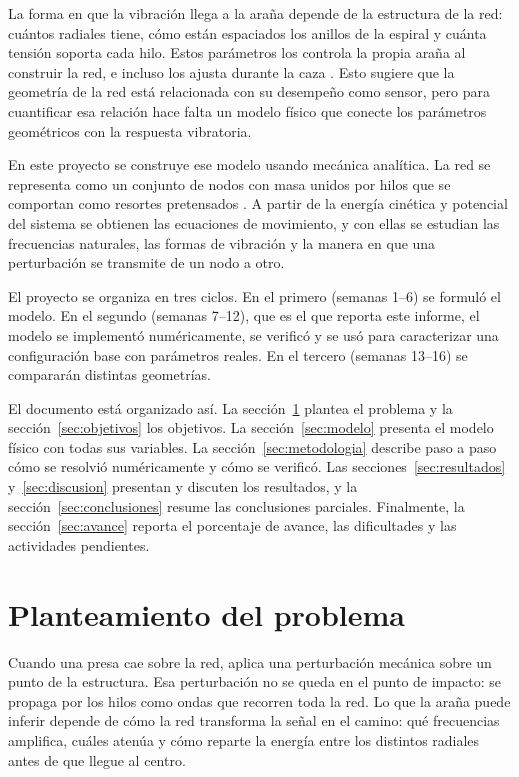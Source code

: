 \documentclass[11pt,letterpaper]{article}
\begin{document}
La forma en que la vibración llega a la araña depende de la estructura de la
red: cuántos radiales tiene, cómo están espaciados los anillos de la
espiral y cuánta tensión soporta cada hilo. Estos parámetros los controla la
propia araña al construir la red, e incluso los ajusta durante la caza
\cite{nakata2010}. Esto sugiere que la geometría de la red está relacionada
con su desempeño como sensor, pero para cuantificar esa relación hace falta
un modelo físico que conecte los parámetros geométricos con la respuesta
vibratoria.

En este proyecto se construye ese modelo usando mecánica analítica. La red se
representa como un conjunto de nodos con masa unidos por hilos que se
comportan como resortes pretensados \cite{aoyanagi2010}. A partir de la
energía cinética y potencial del sistema se obtienen las ecuaciones de
movimiento, y con ellas se estudian las frecuencias naturales, las formas de
vibración y la manera en que una perturbación se transmite de un nodo a
otro.

El proyecto se organiza en tres ciclos. En el primero (semanas 1--6) se
formuló el modelo. En el segundo (semanas 7--12), que es el que reporta este
informe, el modelo se implementó numéricamente, se verificó y se usó para
caracterizar una configuración base con parámetros reales. En el tercero
(semanas 13--16) se compararán distintas geometrías.

El documento está organizado así. La sección~\ref{sec:problema} plantea el
problema y la sección~\ref{sec:objetivos} los objetivos. La
sección~\ref{sec:modelo} presenta el modelo físico con todas sus variables.
La sección~\ref{sec:metodologia} describe paso a paso cómo se resolvió
numéricamente y cómo se verificó. Las secciones~\ref{sec:resultados}
y~\ref{sec:discusion} presentan y discuten los resultados, y la
sección~\ref{sec:conclusiones} resume las conclusiones parciales. Finalmente,
la sección~\ref{sec:avance} reporta el porcentaje de avance, las dificultades
y las actividades pendientes.

\section{Planteamiento del problema}\label{sec:problema}

Cuando una presa cae sobre la red, aplica una perturbación mecánica sobre un
punto de la estructura. Esa perturbación no se queda en el punto de impacto:
se propaga por los hilos como ondas que recorren toda la red. Lo que la araña
puede inferir depende de cómo la red transforma la señal en el camino:
qué frecuencias amplifica, cuáles atenúa y cómo reparte la energía entre los
distintos radiales antes de que llegue al centro.
\end{document}
